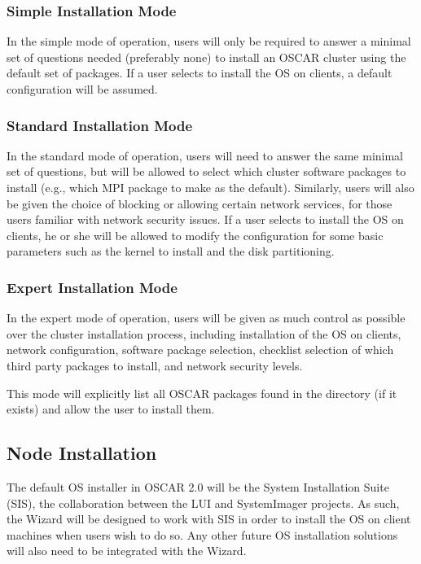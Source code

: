 \subsubsection{Simple Installation Mode}

In the simple mode of operation, users will only be required to answer
a minimal set of questions needed (preferably none) to install an
OSCAR cluster using the default set of packages. If a user selects to
install the OS on clients, a default configuration will be assumed.

\subsubsection{Standard Installation Mode}

In the standard mode of operation, users will need to answer the same
minimal set of questions, but will be allowed to select which cluster
software packages to install (e.g., which MPI package to make as the
default). Similarly, users will also be given the choice of blocking
or allowing certain network services, for those users familiar with
network security issues.  If a user selects to install the OS on
clients, he or she will be allowed to modify the configuration for
some basic parameters such as the kernel to install and the disk
partitioning.

\subsubsection{Expert Installation Mode}

In the expert mode of operation, users will be given as much control
as possible over the cluster installation process, including
installation of the OS on clients, network configuration, software
package selection, checklist selection of which third party packages
to install, and network security levels.

This mode will explicitly list all OSCAR packages found in the
 directory (if it exists) and allow the user to
install them.  

\subsection{Node Installation}

The default OS installer in OSCAR 2.0 will be the System Installation
Suite (SIS), the collaboration between the LUI and SystemImager
projects. As such, the Wizard will be designed to work with SIS in
order to install the OS on client machines when users wish to do so.
Any other future OS installation solutions will also need to be
integrated with the Wizard.

